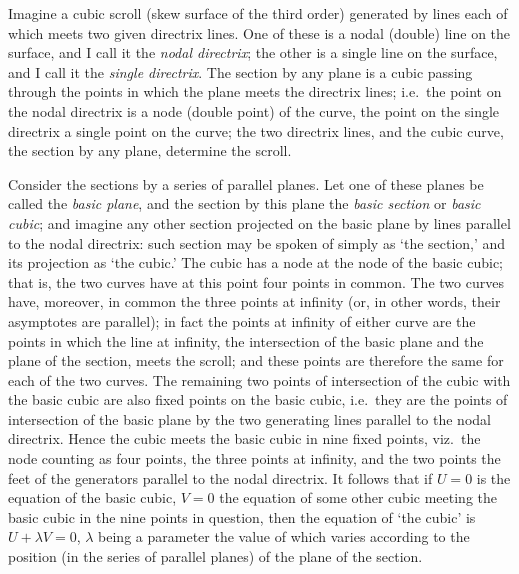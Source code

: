 \documentclass[11pt,a4paper]{article}
\begin{document}

\bigskip

\noindent Imagine a cubic scroll (skew surface of the third order) generated by lines each of which meets two given directrix lines. One of these is a nodal (double) line on the surface, and I call it the \emph{nodal directrix}; the other is a single line on the surface, and I call it the \emph{single directrix}. The section by any plane is a cubic passing through the points in which the plane meets the directrix lines; i.e.\ the point on the nodal directrix is a node (double point) of the curve, the point on the single directrix a single point on the curve; the two directrix lines, and the cubic curve, the section by any plane, determine the scroll.

Consider the sections by a series of parallel planes. Let one of these planes be called the \emph{basic plane}, and the section by this plane the \emph{basic section} or \emph{basic cubic}; and imagine any other section projected on the basic plane by lines parallel to the nodal directrix: such section may be spoken of simply as `the section,' and its projection as `the cubic.' The cubic has a node at the node of the basic cubic; that is, the two curves have at this point four points in common. The two curves have, moreover, in common the three points at infinity (or, in other words, their asymptotes are parallel); in fact the points at infinity of either curve are the points in which the line at infinity, the intersection of the basic plane and the plane of the section, meets the scroll; and these points are therefore the same for each of the two curves. The remaining two points of intersection of the cubic with the basic cubic are also fixed points on the basic cubic, i.e.\ they are the points of intersection of the basic plane by the two generating lines parallel to the nodal directrix. Hence the cubic meets the basic cubic in nine fixed points, viz.\ the node counting as four points, the three points at infinity, and the two points the feet of the generators parallel to the nodal directrix. It follows that if $U=0$ is the equation of the basic cubic, $V=0$ the equation of some other cubic meeting the basic cubic in the nine points in question, then the equation of `the cubic' is $U+\lambda V=0$, $\lambda$ being a parameter the value of which varies according to the position (in the series of parallel planes) of the plane of the section.
\end{document}
